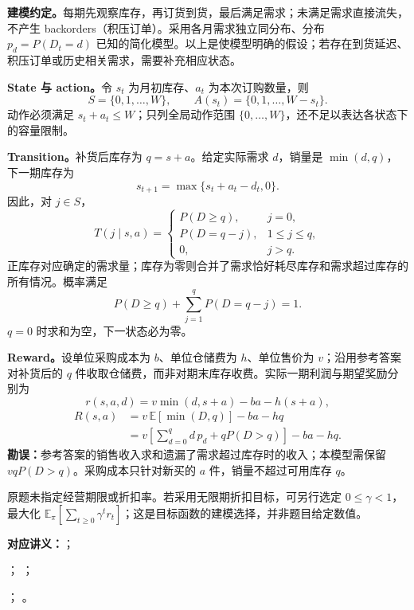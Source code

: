 \begin{checkedsolution}
\textbf{建模约定。}每期先观察库存，再订货到货，最后满足需求；未满足需求直接流失，不产生 backorders（积压订单）。采用各月需求独立同分布、分布 $p_d=P(D_t=d)$ 已知的简化模型。以上是使模型明确的假设；若存在到货延迟、积压订单或历史相关需求，需要补充相应状态。

\textbf{State 与 action。}令 $s_t$ 为月初库存、$a_t$ 为本次订购数量，则
\[
  \boxed{S=\{0,1,\ldots,W\}},\qquad
  \boxed{A(s_t)=\{0,1,\ldots,W-s_t\}}.
\]
动作必须满足 $s_t+a_t\le W$；只列全局动作范围 $\{0,\ldots,W\}$，还不足以表达各状态下的容量限制。

\textbf{Transition。}补货后库存为 $q=s+a$。给定实际需求 $d$，销量是 $\min(d,q)$，下一期库存为
\[
  \boxed{s_{t+1}=\max\{s_t+a_t-d_t,0\}}.
\]
因此，对 $j\in S$，
\[
  \boxed{T(j\mid s,a)=
  \begin{cases}
    P(D\ge q), & j=0,\\
    P(D=q-j), & 1\le j\le q,\\
    0, & j>q.
  \end{cases}}
\]
正库存对应确定的需求量；库存为零则合并了需求恰好耗尽库存和需求超过库存的所有情况。概率满足
\[
  P(D\ge q)+\sum_{j=1}^{q}P(D=q-j)=1.
\]
$q=0$ 时求和为空，下一状态必为零。

\textbf{Reward。}设单位采购成本为 $b$、单位仓储费为 $h$、单位售价为 $v$；沿用参考答案对补货后的 $q$ 件收取仓储费，而非对期末库存收费。实际一期利润与期望奖励分别为
\[
  \boxed{r(s,a,d)=v\min(d,s+a)-ba-h(s+a)},
\]
\[
\begin{aligned}
  R(s,a)
    &=v\,\mathbb E[\min(D,q)]-ba-hq\\
    &=v\left[\sum_{d=0}^{q}d\,p_d+qP(D>q)\right]-ba-hq.
\end{aligned}
\]
\textbf{勘误：}参考答案的销售收入求和遗漏了需求超过库存时的收入；本模型需保留 $vqP(D>q)$。采购成本只针对新买的 $a$ 件，销量不超过可用库存 $q$。

原题未指定经营期限或折扣率。若采用无限期折扣目标，可另行选定 $0\le\gamma<1$，最大化 $\mathbb E_\pi[\sum_{t\ge0}\gamma^t r_t]$；这是目标函数的建模选择，并非题目给定数值。
\end{checkedsolution}


\textbf{对应讲义：}；\par
{}；
；\par
{}；
。

